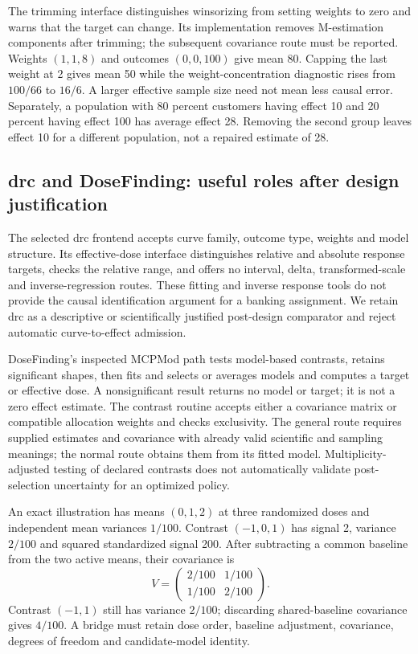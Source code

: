 The trimming interface distinguishes winsorizing from setting weights to zero
and warns that the target can change. Its implementation removes M-estimation
components after trimming; the subsequent covariance route must be reported.
Weights $(1,1,8)$ and outcomes $(0,0,100)$ give mean 80. Capping the last
weight at 2 gives mean 50 while the weight-concentration diagnostic rises from
$100/66$ to $16/6$. A larger effective sample size need not mean less causal
error. Separately, a population with 80 percent customers having effect 10 and
20 percent having effect 100 has average effect 28. Removing the second group
leaves effect 10 for a different population, not a repaired estimate of 28.
\citep{exec24_dose_weightit,exec24_dose_contract}

\subsection{drc and DoseFinding: useful roles after design justification}
The selected drc frontend accepts curve family, outcome type, weights and model
structure. Its effective-dose interface distinguishes relative and absolute
response targets, checks the relative range, and offers no interval, delta,
transformed-scale and inverse-regression routes. These fitting and inverse
response tools do not provide the causal identification argument for a banking
assignment. We retain drc as a descriptive or scientifically justified
post-design comparator and reject automatic curve-to-effect admission.
\citep{exec24_dose_drc}

DoseFinding's inspected MCPMod path tests model-based contrasts, retains
significant shapes, then fits and selects or averages models and computes a
target or effective dose. A nonsignificant result returns no model or target;
it is not a zero effect estimate. The contrast routine accepts either a
covariance matrix or compatible allocation weights and checks exclusivity.
The general route requires supplied estimates and covariance with already
valid scientific and sampling meanings; the normal route obtains them from
its fitted model. Multiplicity-adjusted testing of declared contrasts does not
automatically validate post-selection uncertainty for an optimized policy.
\citep{exec24_dose_dosefinding}

An exact illustration has means $(0,1,2)$ at three randomized doses and
independent mean variances $1/100$. Contrast $(-1,0,1)$ has signal 2, variance
$2/100$ and squared standardized signal 200. After subtracting a common
baseline from the two active means, their covariance is
\[
 V=\begin{pmatrix}2/100&1/100\\1/100&2/100\end{pmatrix}.
\]
Contrast $(-1,1)$ still has variance $2/100$; discarding shared-baseline
covariance gives $4/100$. A bridge must retain dose order, baseline adjustment,
covariance, degrees of freedom and candidate-model identity.
\citep{exec24_dose_contract}

